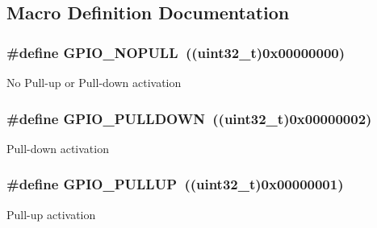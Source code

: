 \subsection{Macro Definition Documentation}
\hypertarget{group___g_p_i_o__pull_ga5c2862579882c1cc64e36d38fbd07a4c}{
\subsubsection[{G\-P\-I\-O\-\_\-\-N\-O\-P\-U\-L\-L}]{\setlength{\rightskip}{0pt plus 5cm}\#define G\-P\-I\-O\-\_\-\-N\-O\-P\-U\-L\-L~((uint32\-\_\-t)0x00000000)}}\label{group___g_p_i_o__pull_ga5c2862579882c1cc64e36d38fbd07a4c}
No Pull-\/up or Pull-\/down activation \hypertarget{group___g_p_i_o__pull_ga75d958d0410c36da7f27d1f4f5c36c14}{
\subsubsection[{G\-P\-I\-O\-\_\-\-P\-U\-L\-L\-D\-O\-W\-N}]{\setlength{\rightskip}{0pt plus 5cm}\#define G\-P\-I\-O\-\_\-\-P\-U\-L\-L\-D\-O\-W\-N~((uint32\-\_\-t)0x00000002)}}\label{group___g_p_i_o__pull_ga75d958d0410c36da7f27d1f4f5c36c14}
Pull-\/down activation \hypertarget{group___g_p_i_o__pull_gae689bc8f5c42d6df7bd54a8dd372e072}{
\subsubsection[{G\-P\-I\-O\-\_\-\-P\-U\-L\-L\-U\-P}]{\setlength{\rightskip}{0pt plus 5cm}\#define G\-P\-I\-O\-\_\-\-P\-U\-L\-L\-U\-P~((uint32\-\_\-t)0x00000001)}}\label{group___g_p_i_o__pull_gae689bc8f5c42d6df7bd54a8dd372e072}
Pull-\/up activation 